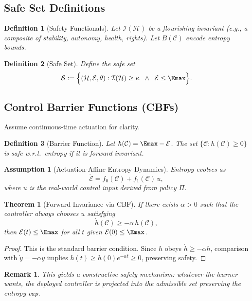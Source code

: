 \documentclass[11pt]{article}
\newtheorem{definition}{Definition}
\newtheorem{assumption}{Assumption}
\newtheorem{theorem}{Theorem}
\newtheorem{remark}{Remark}
\newcommand{\Eenv}{\mathcal{E}}     %
\newcommand{\Hsys}{\mathcal{H}}     %
\newcommand{\Civ}{\mathcal{C}}      %
\newcommand{\Ssafe}{\mathcal{S}}    %
\newcommand{\I}{\mathcal{I}}        %
\begin{document}
\subsection{Safe Set Definitions}

\begin{definition}[Safety Functionals]
Let $\I(\Hsys)$ be a flourishing invariant (e.g., a composite of stability, autonomy, health, rights). Let $B(\Civ)$ encode entropy bounds.
\end{definition}

\begin{definition}[Safe Set]
Define the safe set
\[
\Ssafe := \Big\{(\Hsys,\Eenv,\theta): \I(\Hsys)\ge \kappa \;\;\wedge\;\; \Eenv \le \Emax \Big\}.
\]
\end{definition}

\subsection{Control Barrier Functions (CBFs)}

Assume continuous-time actuation for clarity.

\begin{definition}[Barrier Function]
Let $h(\Civ)=\Emax-\Eenv$. The set $\{\Civ: h(\Civ)\ge 0\}$ is safe w.r.t.\ entropy if it is forward invariant.
\end{definition}

\begin{assumption}[Actuation-Affine Entropy Dynamics]
Entropy evolves as
\[
\dot{\Eenv}= f_0(\Civ) + f_1(\Civ)\,u,
\]
where $u$ is the real-world control input derived from policy $\Pi$.
\end{assumption}

\begin{theorem}[Forward Invariance via CBF]
If there exists $\alpha>0$ such that the controller always chooses $u$ satisfying
\[
\dot{h}(\Civ) \ge -\alpha\, h(\Civ),
\]
then $\Eenv(t)\le \Emax$ for all $t$ given $\Eenv(0)\le \Emax$.
\end{theorem}

\begin{proof}
This is the standard barrier condition. Since $h$ obeys $\dot{h}\ge -\alpha h$, comparison with $\dot{y}=-\alpha y$ implies $h(t)\ge h(0)e^{-\alpha t}\ge 0$, preserving safety.
\end{proof}

\begin{remark}
This yields a \emph{constructive} safety mechanism: whatever the learner wants, the deployed controller is projected into the admissible set preserving the entropy cap.
\end{remark}
\end{document}
